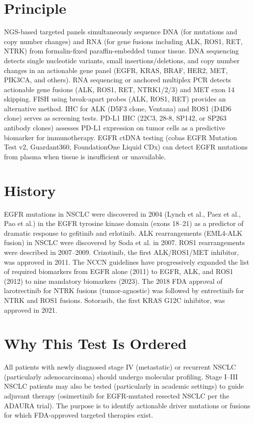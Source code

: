 \section*{Principle}
NGS-based targeted panels simultaneously sequence DNA (for mutations and copy number changes) and RNA (for gene fusions including ALK, ROS1, RET, NTRK) from formalin-fixed paraffin-embedded tumor tissue. DNA sequencing detects single nucleotide variants, small insertions/deletions, and copy number changes in an actionable gene panel (EGFR, KRAS, BRAF, HER2, MET, PIK3CA, and others). RNA sequencing or anchored multiplex PCR detects actionable gene fusions (ALK, ROS1, RET, NTRK1/2/3) and MET exon 14 skipping. FISH using break-apart probes (ALK, ROS1, RET) provides an alternative method. IHC for ALK (D5F3 clone, Ventana) and ROS1 (D4D6 clone) serves as screening tests. PD-L1 IHC (22C3, 28-8, SP142, or SP263 antibody clones) assesses PD-L1 expression on tumor cells as a predictive biomarker for immunotherapy. EGFR ctDNA testing (cobas EGFR Mutation Test v2, Guardant360, FoundationOne Liquid CDx) can detect EGFR mutations from plasma when tissue is insufficient or unavailable.

\section*{History}
EGFR mutations in NSCLC were discovered in 2004 (Lynch et al., Paez et al., Pao et al.) in the EGFR tyrosine kinase domain (exons 18--21) as a predictor of dramatic response to gefitinib and erlotinib. ALK rearrangements (EML4-ALK fusion) in NSCLC were discovered by Soda et al. in 2007. ROS1 rearrangements were described in 2007--2009. Crizotinib, the first ALK/ROS1/MET inhibitor, was approved in 2011. The NCCN guidelines have progressively expanded the list of required biomarkers from EGFR alone (2011) to EGFR, ALK, and ROS1 (2012) to nine mandatory biomarkers (2023). The 2018 FDA approval of larotrectinib for NTRK fusions (tumor-agnostic) was followed by entrectinib for NTRK and ROS1 fusions. Sotorasib, the first KRAS G12C inhibitor, was approved in 2021.

\section*{Why This Test Is Ordered}
All patients with newly diagnosed stage IV (metastatic) or recurrent NSCLC (particularly adenocarcinoma) should undergo molecular profiling. Stage I--III NSCLC patients may also be tested (particularly in academic settings) to guide adjuvant therapy (osimertinib for EGFR-mutated resected NSCLC per the ADAURA trial). The purpose is to identify actionable driver mutations or fusions for which FDA-approved targeted therapies exist.

